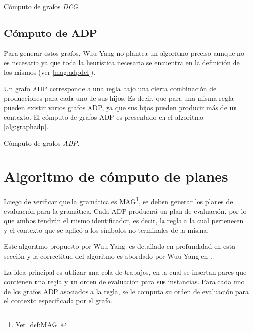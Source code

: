 \begin{algorithm}[!ht]

\vspace{-0.5cm}
\caption{\label{alg:graphdcg}Cómputo de grafos \textit{DCG}.}
\end{algorithm}

\subsection{Cómputo de ADP}
\label{subsec:alg-ADP} 
Para generar estos grafos, Wuu Yang no plantea un algoritmo preciso aunque no es necesario ya que toda la heurística necesaria se encuentra en la definición de los mismos (ver \ref{mag:adpdef}).

Un grafo ADP corresponde a una regla bajo una cierta combinación de producciones para cada uno de sus hijos. Es decir, que para una misma regla pueden existir varios grafos ADP, ya que sus hijos pueden producir más de un contexto. El cómputo de grafos ADP es presentado en el algoritmo \ref{alg:graphadp}.

\begin{algorithm}[!ht]

\vspace{-0.5cm}
\caption{\label{alg:graphadp}Cómputo de grafos \textit{ADP}.}
\end{algorithm}

\section{Algoritmo de cómputo de planes}
\label{sec:comp-planes}
Luego de verificar que la gramática es MAG\footnote{Ver \ref{def:MAG}.}, se deben generar los planes de evaluación para la gramática. Cada ADP producirá un plan de evaluación, por lo que ambos tendrán el mismo identificador, es decir, la regla a la cual pertenecen y el contexto que se aplicó a los símbolos no terminales de la misma.

Este algoritmo propuesto por Wuu Yang, es detallado en profundidad en esta sección y la correctitud del algoritmo es abordado por Wuu Yang en \cite{wuu-yang1}.

La idea principal es utilizar una cola de trabajos, en la cual se insertan pares que contienen una regla y un orden de evaluación para sus instancias. Para cada uno de los grafos ADP asociados a la regla, se le computa su orden de evaluación para el contexto especificado por el grafo.

